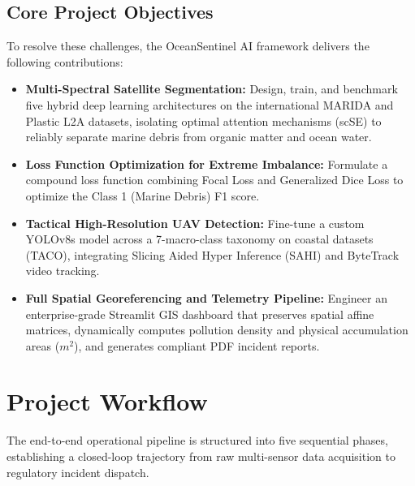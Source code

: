\documentclass[conference]{IEEEtran}
\begin{document}
\subsection{Core Project Objectives}
To resolve these challenges, the OceanSentinel AI framework delivers the following contributions:
\begin{itemize}
    \item \textbf{Multi-Spectral Satellite Segmentation:} Design, train, and benchmark five hybrid deep learning architectures on the international MARIDA and Plastic L2A datasets, isolating optimal attention mechanisms (scSE) to reliably separate marine debris from organic matter and ocean water.
    \item \textbf{Loss Function Optimization for Extreme Imbalance:} Formulate a compound loss function combining Focal Loss and Generalized Dice Loss to optimize the Class 1 (Marine Debris) F1 score.
    \item \textbf{Tactical High-Resolution UAV Detection:} Fine-tune a custom YOLOv8s model across a 7-macro-class taxonomy on coastal datasets (TACO), integrating Slicing Aided Hyper Inference (SAHI) and ByteTrack video tracking.
    \item \textbf{Full Spatial Georeferencing and Telemetry Pipeline:} Engineer an enterprise-grade Streamlit GIS dashboard that preserves spatial affine matrices, dynamically computes pollution density and physical accumulation areas ($m^2$), and generates compliant PDF incident reports.
\end{itemize}

\section{Project Workflow}

The end-to-end operational pipeline is structured into five sequential phases, establishing a closed-loop trajectory from raw multi-sensor data acquisition to regulatory incident dispatch.
\end{document}
